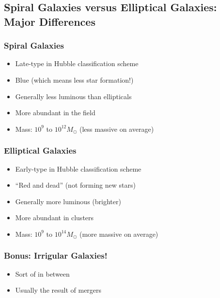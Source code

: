 \documentclass{book}
\begin{document}
\subsection{Spiral Galaxies versus Elliptical Galaxies: Major Differences}
\subsubsection{Spiral Galaxies}
\begin{itemize}
    \item Late-type in Hubble classification scheme
    \item Blue (which means less star formation!)
    \item Generally less luminous than ellipticals
    \item More abundant in the field
    \item Mass: $10^9$ to $10^{12} M_\odot$ (less massive on average)
\end{itemize}
\subsubsection{Elliptical Galaxies}
\begin{itemize}
    \item Early-type in Hubble classification scheme
    \item ``Red and dead'' (not forming new stars)
    \item Generally more luminous (brighter)
    \item More abundant in clusters
    \item Mass: $10^9$ to $10^{14} M_\odot$ (more massive on average)
\end{itemize}
\subsubsection{Bonus: Irrigular Galaxies!}
\begin{itemize}
    \item Sort of in between
    \item Usually the result of mergers
\end{itemize}
\end{document}

